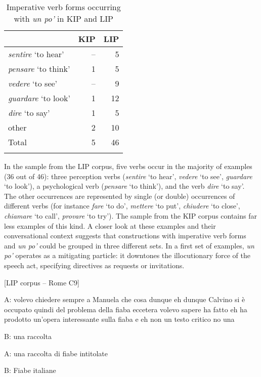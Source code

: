 \begin{table}
\begin{tabularx}{0.5\textwidth}{Xrr}
\lsptoprule
 & {KIP} & {LIP}\\
 \midrule
\textit{sentire} ‘to hear’ & {–} & {5} \\
\textit{pensare} ‘to think’ & {1} & {5} \\
\textit{vedere} ‘to see’ & {–} & {9} \\
\textit{guardare} ‘to look’ & {1} & {12} \\
\textit{dire} ‘to say’ & {1} & {5} \\
other & {2} & {10} \\
\midrule
{Total} & {5} & {46}\\
\lspbottomrule
\end{tabularx}
\caption{\label{tab:key:7.2} Imperative verb forms occurring with \textit{un po’} in KIP and LIP}
\end{table}

In the sample from the LIP corpus, five verbs occur in the majority of examples (36 out of 46): three perception verbs (\textit{sentire} ‘to hear’, \textit{vedere} ‘to see’, \textit{guardare} ‘to look’), a psychological verb (\textit{pensare} ‘to think’), and the verb \textit{dire} ‘to say’. The other occurrences are represented by single (or double) occurrences of different verbs (for instance \textit{fare} ‘to do’, \textit{mettere} ‘to put’, \textit{chiudere} ‘to close’, \textit{chiamare} ‘to call’, \textit{provare} ‘to try’). The sample from the KIP corpus contains far less examples of this kind. A closer look at these examples and their conversational context suggests that constructions with imperative verb forms and \textit{un po’} could be grouped in three different sets. In a first set of examples, \textit{un po’} operates as a mitigating particle: it downtones the illocutionary force of the speech act, specifying directives as requests or invitations.

\ea%
    \label{ex:key:69}

          [LIP corpus – Rome C9]

A:   volevo chiedere sempre a Manuela che cosa dunque eh dunque Calvino si è occupato quindi del problema della fiaba eccetera volevo sapere ha fatto eh ha prodotto un’opera interessante sulla fiaba e eh non un testo critico no una

B:  una raccolta

A:   una raccolta di fiabe intitolate

B:   Fiabe italiane

